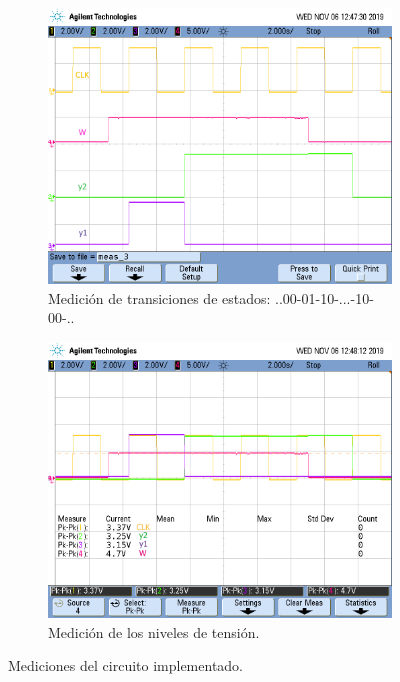 \begin{figure}[H]
\begin{subfigure}{0.49\textwidth}
\centering
\includegraphics[width=\textwidth,trim={0 3.35cm 0.1cm 1.75cm},clip]{ImagenesEjercicio3/states.png}
\caption{Medición de transiciones de estados: ..00-01-10-...-10-00-..}
\label{states1}
\end{subfigure}
\begin{subfigure}{0.49\textwidth}
\centering
\includegraphics[width=\textwidth,trim={0 3.35cm 0.1cm 1.75cm},clip]{ImagenesEjercicio3/vlevels_states.png}
\caption{Medición de los niveles de tensión.}
\end{subfigure}
\caption{Mediciones del circuito implementado.}
\end{figure}

